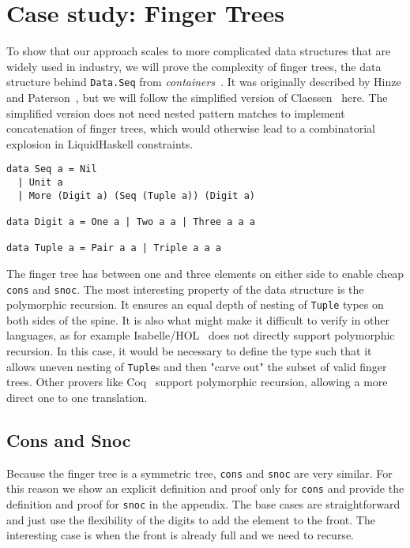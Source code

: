 \documentclass[sigplan,screen,review,anonymous]{acmart}
\begin{document}
\section{Case study: Finger Trees}\label{sec:fingertree}

To show that our approach scales to more complicated data structures that are widely used in industry, we will prove the complexity of finger trees, the data structure behind \texttt{Data.Seq} from \textit{containers}~\cite{containers}. It was originally described by Hinze and Paterson~\cite{fingertrees}, but we will follow the simplified version of Claessen~\cite{fingertrees_new} here. The simplified version does not need nested pattern matches to implement concatenation of finger trees, which would otherwise lead to a combinatorial explosion in LiquidHaskell constraints.

\begin{lstlisting}
data Seq a = Nil
  | Unit a
  | More (Digit a) (Seq (Tuple a)) (Digit a)

data Digit a = One a | Two a a | Three a a a

data Tuple a = Pair a a | Triple a a a
\end{lstlisting}

The finger tree has between one and three elements on either side to enable cheap \texttt{cons} and \texttt{snoc}. The most interesting property of the data structure is the polymorphic recursion. It ensures an equal depth of nesting of \texttt{Tuple} types on both sides of the spine. It is also what might make it difficult to verify in other languages, as for example Isabelle/HOL~\cite{isabelle} does not directly support polymorphic recursion. In this case, it would be necessary to define the type such that it allows uneven nesting of \texttt{Tuple}s and then "carve out" the subset of valid finger trees. Other provers like Coq~\cite{coq} support polymorphic recursion, allowing a more direct one to one translation.

\subsection{Cons and Snoc}

Because the finger tree is a symmetric tree, \texttt{cons} and \texttt{snoc} are very similar. For this reason we show an explicit definition and proof only for \texttt{cons} and provide the definition and proof for \texttt{snoc} in the appendix. The base cases are straightforward and just use the flexibility of the digits to add the element to the front. The interesting case is when the front is already full and we need to recurse.
\end{document}

